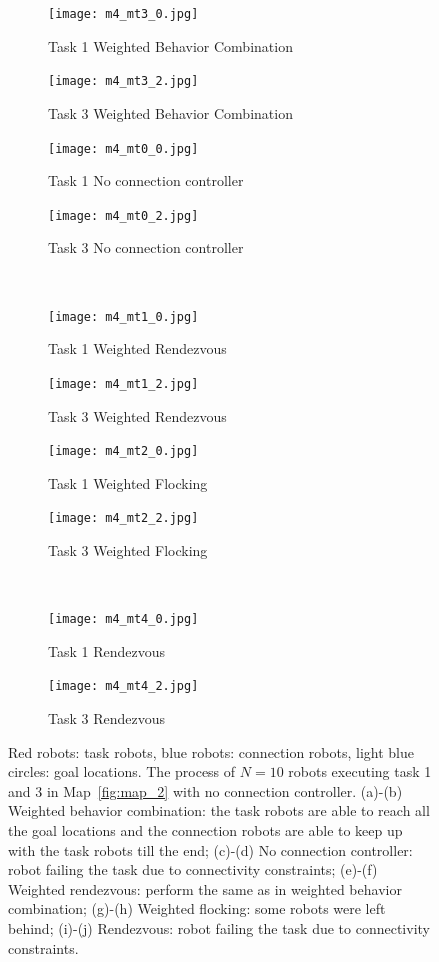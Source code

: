 \documentclass[../main.tex]{subfiles}
\begin{document}
\begin{figure}
\centering
\begin{subfigure}[b]{0.24\textwidth}
\texttt{[image: m4\_mt3\_0.jpg]}
\caption{Task 1 Weighted Behavior Combination}
\label{fig:m4_mt3_0}
\end{subfigure}
\begin{subfigure}[b]{0.24\textwidth}
\texttt{[image: m4\_mt3\_2.jpg]}
\caption{Task 3 Weighted Behavior Combination}
\label{fig:m4_mt3_2}
\end{subfigure} \hfill
\begin{subfigure}[b]{0.24\textwidth}
\texttt{[image: m4\_mt0\_0.jpg]}
\caption{Task 1 No connection controller}
\label{fig:m4_mt0_0}
\end{subfigure}
\begin{subfigure}[b]{0.24\textwidth}
\texttt{[image: m4\_mt0\_2.jpg]}
\caption{Task 3 No connection controller}
\label{fig:m4_mt0_2}
\end{subfigure} \\
\begin{subfigure}[b]{0.24\textwidth}
\texttt{[image: m4\_mt1\_0.jpg]}
\caption{Task 1 Weighted Rendezvous}
\label{fig:m4_mt1_0}
\end{subfigure}
\begin{subfigure}[b]{0.24\textwidth}
\texttt{[image: m4\_mt1\_2.jpg]}
\caption{Task 3 Weighted Rendezvous}
\label{fig:m4_mt1_2}
\end{subfigure} \hfill
\begin{subfigure}[b]{0.24\textwidth}
\texttt{[image: m4\_mt2\_0.jpg]}
\caption{Task 1 Weighted Flocking}
\label{fig:m4_mt2_0}
\end{subfigure}
\begin{subfigure}[b]{0.24\textwidth}
\texttt{[image: m4\_mt2\_2.jpg]}
\caption{Task 3 Weighted Flocking}
\label{fig:m4_mt2_2}
\end{subfigure} \\
\begin{subfigure}[b]{0.24\textwidth}
\texttt{[image: m4\_mt4\_0.jpg]}
\caption{Task 1 Rendezvous}
\label{fig:m4_mt4_0}
\end{subfigure}
\begin{subfigure}[b]{0.24\textwidth}
\texttt{[image: m4\_mt4\_2.jpg]}
\caption{Task 3 Rendezvous}
\label{fig:m4_mt4_2}
\end{subfigure}
\setlength{\belowcaptionskip}{-14pt}
\caption{Red robots: task robots, blue robots: connection robots, light blue circles: goal locations. The process of $N=10$ robots executing task 1 and 3 in Map~\ref{fig:map_2} with no connection controller. (a)-(b) Weighted behavior combination: the task robots are able to reach all the goal locations and the connection robots are able to keep up with the task robots till the end; (c)-(d) No connection controller: robot failing the task due to connectivity constraints; (e)-(f) Weighted rendezvous: perform the same as in weighted behavior combination; (g)-(h) Weighted flocking: some robots were left behind; (i)-(j) Rendezvous: robot failing the task due to connectivity constraints.}
\label{fig:m4}
\end{figure}
\end{document}
